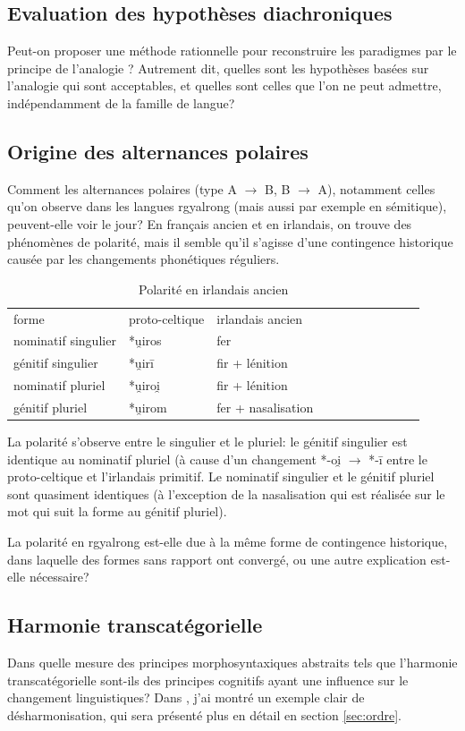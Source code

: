 \documentclass[oldfontcommands,oneside,a4paper,11pt]{memoir}
\begin{document}
\subsection{Evaluation des hypothèses diachroniques}
  Peut-on proposer une méthode rationnelle pour reconstruire les paradigmes par le principe de l'analogie ? Autrement dit, quelles sont les hypothèses basées sur l'analogie qui sont acceptables, et quelles sont celles que l'on ne peut admettre, indépendamment  de la famille de langue?
\subsection{Origine des alternances polaires}
  Comment les alternances polaires (type A $\rightarrow$ B, B $\rightarrow$ A), notamment celles qu'on observe dans les langues rgyalrong (mais aussi par exemple en sémitique), peuvent-elle voir le jour? En français ancien et en irlandais, on trouve des phénomènes de polarité, mais il semble qu'il s'agisse d'une contingence historique causée par les changements phonétiques réguliers. 
\begin{table}[H]
\caption{Polarité en irlandais ancien}  \centering
\begin{tabular}{lllllllllll}  \toprule  
forme & proto-celtique & irlandais ancien \\
nominatif singulier & *u̯iros & fer \\
génitif singulier & *u̯irī & fir + lénition \\
nominatif pluriel & *u̯iroi̯ & fir + lénition \\
génitif pluriel & *u̯irom & fer + nasalisation \\
\bottomrule
\end{tabular}
\end{table}
La polarité s'observe entre le singulier et le pluriel: le génitif singulier est identique au nominatif pluriel (à cause d'un changement *-oi̯ $\rightarrow $ *-ī entre le proto-celtique et l'irlandais primitif. Le nominatif singulier et le génitif pluriel sont quasiment identiques (à l'exception de la nasalisation qui est réalisée sur le mot qui suit la forme au génitif pluriel). 

La polarité en rgyalrong est-elle due à la même forme de contingence historique, dans laquelle des formes sans rapport ont convergé, ou une autre explication est-elle nécessaire?
\subsection{Harmonie transcatégorielle}
  Dans quelle mesure des principes morphosyntaxiques abstraits tels que l'harmonie transcatégorielle sont-ils des principes cognitifs ayant une influence sur le changement linguistiques? Dans \citet{jacques13harmonization}, j'ai montré un exemple clair de désharmonisation, qui sera présenté plus en détail en section \ref{sec:ordre}.
 
\end{document}

